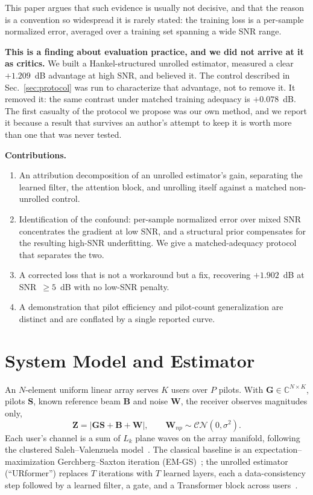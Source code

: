 \documentclass[journal]{IEEEtran}
\newcommand{\bG}{\mathbf{G}}
\newcommand{\bS}{\mathbf{S}}
\newcommand{\bB}{\mathbf{B}}
\newcommand{\bW}{\mathbf{W}}
\newcommand{\bZ}{\mathbf{Z}}
\newcommand{\CN}{\mathcal{CN}}
\begin{document}
This paper argues that such evidence is usually not decisive, and that the
reason is a convention so widespread it is rarely stated: the training loss is
a per-sample normalized error, averaged over a training set spanning a wide
SNR range.

\textbf{This is a finding about evaluation practice, and we did not arrive at
it as critics.} We built a Hankel-structured unrolled estimator, measured a
clear $+1.209$~dB advantage at high SNR, and believed it. The control
described in Sec.~\ref{sec:protocol} was run to characterize that advantage,
not to remove it. It removed it: the same contrast under matched training
adequacy is $+0.078$~dB. The first casualty of the protocol we propose was our
own method, and we report it because a result that survives an author's
attempt to keep it is worth more than one that was never tested.

\textbf{Contributions.}
\begin{enumerate}
\item An attribution decomposition of an unrolled estimator's gain, separating
the learned filter, the attention block, and unrolling itself against a matched
non-unrolled control.
\item Identification of the confound: per-sample normalized error over mixed
SNR concentrates the gradient at low SNR, and a structural prior compensates
for the resulting high-SNR underfitting. We give a matched-adequacy protocol
that separates the two.
\item A corrected loss that is not a workaround but a fix, recovering
$+1.902$~dB at SNR~$\ge5$~dB with no low-SNR penalty.
\item A demonstration that pilot efficiency and pilot-count generalization are
distinct and are conflated by a single reported curve.
\end{enumerate}

\section{System Model and Estimator}

An $N$-element uniform linear array serves $K$ users over $P$ pilots. With
$\bG\in\mathbb{C}^{N\times K}$, pilots $\bS$, known reference beam $\bB$ and
noise $\bW$, the receiver observes magnitudes only,
\begin{equation}
\bZ=\left|\bG\bS+\bB+\bW\right|,\qquad \bW_{np}\sim\CN(0,\sigma^2).
\label{eq:fwd}
\end{equation}
Each user's channel is a sum of $L_k$ plane waves on the array
manifold, following the clustered Saleh--Valenzuela model~\cite{meijerink2014}. The
classical baseline is an expectation--maximization Gerchberg--Saxton iteration
(EM-GS)~\cite{gerchberg1972}; the unrolled estimator
(``URformer'') replaces $T$ iterations with $T$ learned layers, each a
data-consistency step followed by a learned filter, a gate, and a
Transformer block across users~\cite{xiao2026}.
\end{document}
